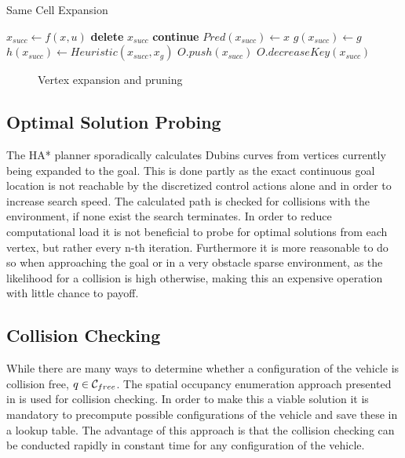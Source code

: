 \begin{algorithm}
\caption{Same Cell Expansion}\label{alg:sameCellExpansion}
    \begin{algorithmic}[1]
                \State $x_{succ} \gets f(x,u)$
		                        \State \textbf{delete} $x_{succ}$
                        		 \State \textbf{continue}
        	                \EndIf            
            	                \State $Pred(x_{succ}) \gets x$
                	            \State $g(x_{succ}) \gets g$
                    	        \State $h(x_{succ}) \gets Heuristic(x_{succ}, x_g)$
                            	    \State $O.push(x_{succ})$
                           		\Else
                                	\State $O.decreaseKey(x_{succ})$
                        \EndIf
                        \EndIf
                    \EndIf
                \EndFor
    \end{algorithmic}
\end{algorithm}

\begin{figure}[h]
    \caption{Vertex expansion and pruning}
    \label{fig:expansionPruning}
\end{figure}

\subsection{Optimal Solution Probing}
The HA* planner sporadically calculates Dubins curves from vertices currently being expanded to the goal. This is done partly as the exact continuous goal location is not reachable by the discretized control actions alone and in order to increase search speed. The calculated path is checked for collisions with the environment, if none exist the search terminates. In order to reduce computational load it is not beneficial to probe for optimal solutions from each vertex, but rather every n-th iteration. Furthermore it is more reasonable to do so when approaching the goal or in a very obstacle sparse environment, as the likelihood for a collision is high otherwise, making this an expensive operation with little chance to payoff.

\subsection{Collision Checking}
While there are many ways to determine whether a configuration of the vehicle is collision free, $q \in \mathcal{C}_{free}$. The spatial occupancy enumeration approach presented in  is used for collision checking. In order to make this a viable solution it is mandatory to precompute possible configurations of the vehicle and save these in a lookup table. The advantage of this approach is that the collision checking can be conducted rapidly in constant time for any configuration of the vehicle.

